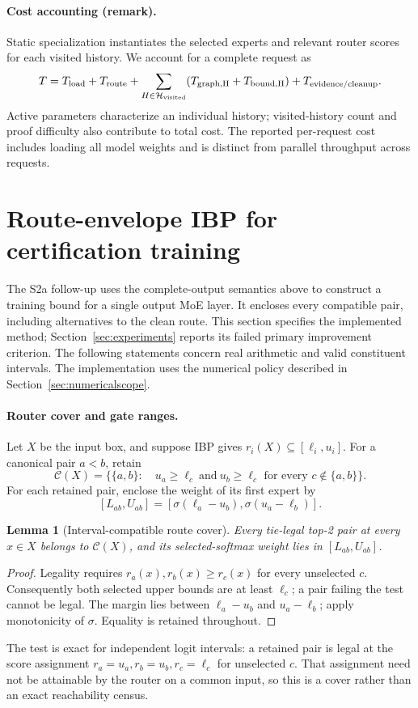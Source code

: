\documentclass[10pt]{article}
\newtheorem{lemma}{Lemma}
\begin{document}
\paragraph{Cost accounting (remark).}
Static specialization instantiates the selected experts and relevant router
scores for each visited history. We account for a complete request as
\[
 T=T_{\rm load}+T_{\rm route}+\sum_{H\in\mathcal H_{\rm visited}}
 (T_{\rm graph,H}+T_{\rm bound,H})+T_{\rm evidence/cleanup}.
\]
Active parameters characterize an individual history; visited-history count
and proof difficulty also contribute to total cost. The reported per-request
cost includes loading all model weights and is distinct from parallel
throughput across requests.

\section{Route-envelope IBP for certification training}
\label{sec:routeibp}
The S2a follow-up uses the complete-output semantics above to construct a
training bound for a single output MoE layer. It encloses every compatible
pair, including alternatives to the clean route. This section specifies the
implemented method; Section~\ref{sec:experiments} reports its failed primary improvement criterion.
The following statements concern real arithmetic and valid constituent
intervals. The implementation uses the numerical policy described in
Section~\ref{sec:numericalscope}.

\paragraph{Router cover and gate ranges.}
Let $X$ be the input box, and suppose IBP gives
$r_i(X)\subseteq[\ell_i,u_i]$. For a canonical pair $a<b$, retain
\[
 \mathcal C(X)=\bigl\{\{a,b\}:\quad
    u_a\geq\ell_c\ \text{and}\ u_b\geq\ell_c
    \text{ for every }c\notin\{a,b\}\bigr\}.
\]
For each retained pair, enclose the weight of its first expert by
\[
 [L_{ab},U_{ab}]=
 [\sigma(\ell_a-u_b),\sigma(u_a-\ell_b)].
\]
\begin{lemma}[Interval-compatible route cover]
Every tie-legal top-2 pair at every $x\in X$ belongs to $\mathcal C(X)$,
and its selected-softmax weight lies in $[L_{ab},U_{ab}]$.
\end{lemma}
\begin{proof}
Legality requires $r_a(x),r_b(x)\geq r_c(x)$ for every unselected $c$.
Consequently both selected upper bounds are at least $\ell_c$; a pair
failing the test cannot be legal. The margin lies between
$\ell_a-u_b$ and $u_a-\ell_b$; apply monotonicity of $\sigma$.
Equality is retained throughout.
\end{proof}
The test is exact for independent logit intervals: a retained pair is legal
at the score assignment $r_a=u_a,r_b=u_b,r_c=\ell_c$ for unselected $c$.
That assignment need not be attainable by the router on a common input, so
this is a cover rather than an exact reachability census.
\end{document}
